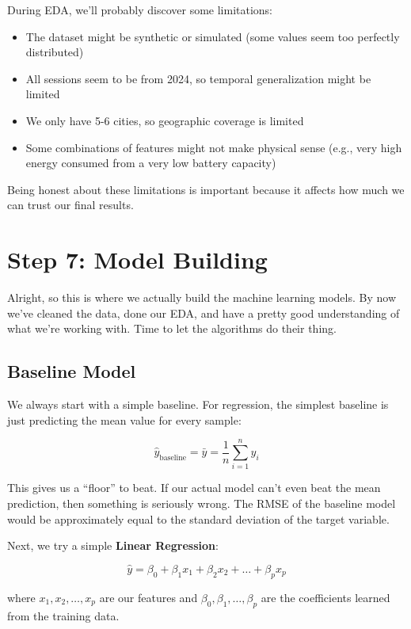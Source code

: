 \documentclass[12pt, a4paper]{article}
\begin{document}
During EDA, we'll probably discover some limitations:
\begin{itemize}
    \item The dataset might be synthetic or simulated (some values seem too perfectly distributed)
    \item All sessions seem to be from 2024, so temporal generalization might be limited
    \item We only have 5-6 cities, so geographic coverage is limited
    \item Some combinations of features might not make physical sense (e.g., very high energy consumed from a very low battery capacity)
\end{itemize}

Being honest about these limitations is important because it affects how much we can trust our final results.

\newpage

\section{Step 7: Model Building}

Alright, so this is where we actually build the machine learning models. By now we've cleaned the data, done our EDA, and have a pretty good understanding of what we're working with. Time to let the algorithms do their thing.

\subsection{Baseline Model}

We always start with a simple baseline. For regression, the simplest baseline is just predicting the mean value for every sample:

$$\hat{y}_{\text{baseline}} = \bar{y} = \frac{1}{n} \sum_{i=1}^{n} y_i$$

This gives us a ``floor'' to beat. If our actual model can't even beat the mean prediction, then something is seriously wrong. The RMSE of the baseline model would be approximately equal to the standard deviation of the target variable.

Next, we try a simple \textbf{Linear Regression}:

$$\hat{y} = \beta_0 + \beta_1 x_1 + \beta_2 x_2 + \ldots + \beta_p x_p$$

where $x_1, x_2, \ldots, x_p$ are our features and $\beta_0, \beta_1, \ldots, \beta_p$ are the coefficients learned from the training data.
\end{document}
